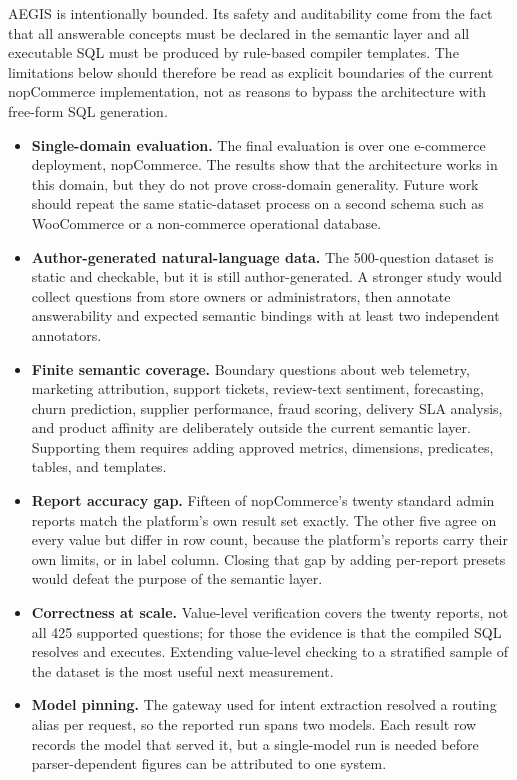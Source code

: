 \documentclass[pdflatex,sn-mathphys-num]{sn-jnl}
\begin{document}
AEGIS is intentionally bounded. Its safety and auditability come from the fact that all answerable concepts must be declared in the semantic layer and all executable SQL must be produced by rule-based compiler templates. The limitations below should therefore be read as explicit boundaries of the current nopCommerce implementation, not as reasons to bypass the architecture with free-form SQL generation.


\begin{itemize}
\item \textbf{Single-domain evaluation.} The final evaluation is over one e-commerce deployment, nopCommerce. The results show that the architecture works in this domain, but they do not prove cross-domain generality. Future work should repeat the same static-dataset process on a second schema such as WooCommerce or a non-commerce operational database.
\item \textbf{Author-generated natural-language data.} The 500-question dataset is static and checkable, but it is still author-generated. A stronger study would collect questions from store owners or administrators, then annotate answerability and expected semantic bindings with at least two independent annotators.
\item \textbf{Finite semantic coverage.} Boundary questions about web telemetry, marketing attribution, support tickets, review-text sentiment, forecasting, churn prediction, supplier performance, fraud scoring, delivery SLA analysis, and product affinity are deliberately outside the current semantic layer. Supporting them requires adding approved metrics, dimensions, predicates, tables, and templates.
\item \textbf{Report accuracy gap.} Fifteen of nopCommerce's twenty standard admin reports match the platform's own result set exactly. The other five agree on every value but differ in row count, because the platform's reports carry their own limits, or in label column. Closing that gap by adding per-report presets would defeat the purpose of the semantic layer.
\item \textbf{Correctness at scale.} Value-level verification covers the twenty reports, not all 425 supported questions; for those the evidence is that the compiled SQL resolves and executes. Extending value-level checking to a stratified sample of the dataset is the most useful next measurement.
\item \textbf{Model pinning.} The gateway used for intent extraction resolved a routing alias per request, so the reported run spans two models. Each result row records the model that served it, but a single-model run is needed before parser-dependent figures can be attributed to one system.

\end{itemize}
\end{document}
